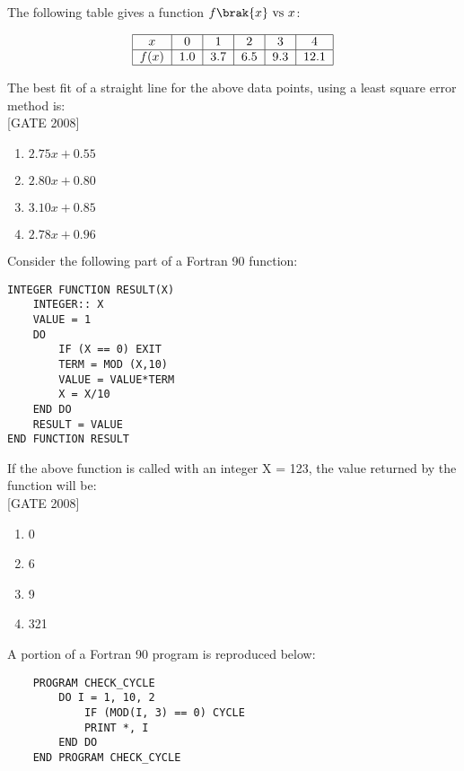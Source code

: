 \item The following table gives a function $f\brak{x}\text{ vs }x$:



\[
\begin{tabular}{|c|c|c|c|c|c|}
\hline
$x$ & 0 & 1 & 2 & 3 & 4 \\
\hline
$f(x)$ & 1.0 & 3.7 & 6.5 & 9.3 & 12.1 \\
\hline
\end{tabular}
\]

The best fit of a straight line for the above data points, using a least square error method is:
\\ \text{ }\hfill{[GATE 2008]}


\begin{multicols}{4}
    \begin{enumerate}
    \item $2.75x + 0.55$
    \item $2.80x + 0.80$
    \item $3.10x + 0.85$
    \item $2.78x + 0.96$
\end{enumerate}
\end{multicols}



\item Consider the following part of a Fortran 90 function:

\begin{verbatim}
INTEGER FUNCTION RESULT(X)
    INTEGER:: X
    VALUE = 1
    DO
        IF (X == 0) EXIT
        TERM = MOD (X,10)
        VALUE = VALUE*TERM
        X = X/10
    END DO
    RESULT = VALUE
END FUNCTION RESULT
\end{verbatim}

If the above function is called with an integer X = 123, the value returned by the function will be: \\ \text{ }\hfill{[GATE 2008]}
\begin{multicols}{4}
\begin{enumerate}
    \item 0
    \item 6
    \item 9
    \item 321
\end{enumerate}
\end{multicols}
\item A portion of a Fortran 90 program is reproduced below:

\begin{verbatim}
    PROGRAM CHECK_CYCLE
        DO I = 1, 10, 2
            IF (MOD(I, 3) == 0) CYCLE
            PRINT *, I
        END DO
    END PROGRAM CHECK_CYCLE
\end{verbatim}

